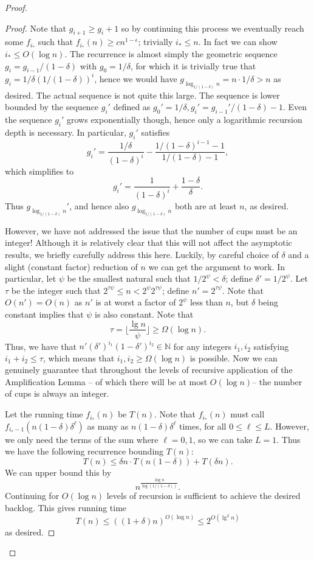 \documentclass[twocolumn]{article}[10pt]
\begin{document}
\begin{proof}
\begin{proof}
  Note that $g_{i+1} \ge g_i + 1$ so by continuing this process we eventually
  reach some $f_{i_*}$ such that $f_{i_*}(n) \ge cn^{1-\epsilon}$; trivially
  $i_* \le n$. In fact we can show $i_* \le O(\log n)$. The recurrence is
  almost simply the geometric sequence $g_i = g_{i-1}/(1-\delta)$ with
  $g_0=1/\delta$, for which it is trivially true that $g_i = 1/\delta
  (1/(1-\delta))^i$, hence we would have $g_{\log_{1/(1-\delta)} n} = n\cdot 1/\delta > n$ as
  desired. The actual sequence is not quite this large. The sequence is lower
  bounded by the sequence $g_i'$ defined as $g_0'=1/\delta, g_i' = g_{i-1}' /
  (1-\delta) -1$. Even the sequence $g_i'$ grows exponentially though, hence
  only a logarithmic recursion depth is necessary. In particular, $g_i'$ satisfies
  $$g_i' = \frac{1/\delta}{(1-\delta)^i} - \frac{1/(1-\delta)^{i-1}-1}{1/(1-\delta)-1},$$
  which simplifies to
  $$g_i' = \frac{1}{(1-\delta)^i} + \frac{1-\delta}{\delta}.$$
  Thus $g_{\log_{1/(1-\delta)} n}'$, and hence also $g_{\log_{1/(1-\delta)} n}$
  both are at least $n$, as desired.

  However, we have not addressed the issue that the number of cups must be an
  integer! Although it is relatively clear that this will not affect the
  asymptotic results, we briefly carefully address this here. Luckily, by
  careful choice of $\delta$ and a slight (constant factor) reduction of $n$ we can get the
  argument to work. In particular, let $\psi$ be the smallest natural such that
  $1/2^\psi < \delta$; define $\delta' = 1/2^\psi$. Let $\tau$ be the integer
  such that $2^{\tau \psi} \le n < 2^\psi 2^{\tau \psi}$; define $n' =
  2^{\tau\psi}$. Note that $O(n') = O(n)$ as $n'$ is at worst a factor of
  $2^\psi$ less than $n$, but $\delta$ being constant implies that $\psi$ is
  also constant. Note that $$\tau = \Big\lfloor \frac{\lg n}{\psi} \Big\rfloor \ge \Omega(\log n).$$
  Thus, we have that $n'(\delta')^{i_1}(1-\delta')^{i_2} \in \mathbb{N}$ for any
  integers $i_1,i_2$ satisfying $i_1+i_2 \le \tau$, which means that $i_1,i_2\ge \Omega(\log n)$ is possible.
  Now we can genuinely guarantee that throughout the levels of recursive application of
  the Amplification Lemma -- of which there will be at most $O(\log n)$-- the
  number of cups is always an integer. 

  Let the running time $f_{i_*}(n)$ be $T(n)$.
  Note that $f_{i_*}(n)$ must call $f_{i_*-1}(n(1-\delta)\delta^\ell)$ as many
  as $n(1-\delta)\delta^\ell$ times, for all $0 \le \ell\le L$. However, we
  only need the terms of the sum where $\ell=0,1$, so we can take $L=1$.
  Thus we have the following recurrence bounding $T(n)$:
  $$T(n) \le \delta n \cdot T(n(1-\delta)) + T(\delta n).$$
  We can upper bound this by
  $$n^{\frac{\log n}{\log (1/(1-\delta))}}.$$
  Continuing for $O(\log n)$ levels of recursion is sufficient to
  achieve the desired backlog. This gives running time
  $$T(n) \le ((1+\delta) n)^{O(\log n)} \le 2^{O(\lg^2 n)}$$
  as desired.
    

\end{proof}
\end{proof}
\end{document}
